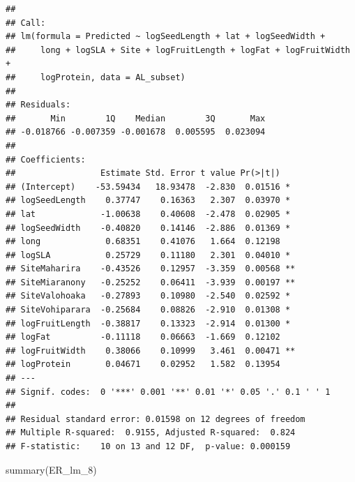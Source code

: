 \documentclass[
  12pt,
]{article}
\newenvironment{Shaded}{\begin{snugshade}}{\end{snugshade}}
\newcommand{\FunctionTok}[1]{\textcolor[rgb]{0.00,0.00,0.00}{#1}}
\newcommand{\NormalTok}[1]{#1}
\begin{document}
\begin{verbatim}
## 
## Call:
## lm(formula = Predicted ~ logSeedLength + lat + logSeedWidth + 
##     long + logSLA + Site + logFruitLength + logFat + logFruitWidth + 
##     logProtein, data = AL_subset)
## 
## Residuals:
##       Min        1Q    Median        3Q       Max 
## -0.018766 -0.007359 -0.001678  0.005595  0.023094 
## 
## Coefficients:
##                 Estimate Std. Error t value Pr(>|t|)   
## (Intercept)    -53.59434   18.93478  -2.830  0.01516 * 
## logSeedLength    0.37747    0.16363   2.307  0.03970 * 
## lat             -1.00638    0.40608  -2.478  0.02905 * 
## logSeedWidth    -0.40820    0.14146  -2.886  0.01369 * 
## long             0.68351    0.41076   1.664  0.12198   
## logSLA           0.25729    0.11180   2.301  0.04010 * 
## SiteMaharira    -0.43526    0.12957  -3.359  0.00568 **
## SiteMiaranony   -0.25252    0.06411  -3.939  0.00197 **
## SiteValohoaka   -0.27893    0.10980  -2.540  0.02592 * 
## SiteVohiparara  -0.25684    0.08826  -2.910  0.01308 * 
## logFruitLength  -0.38817    0.13323  -2.914  0.01300 * 
## logFat          -0.11118    0.06663  -1.669  0.12102   
## logFruitWidth    0.38066    0.10999   3.461  0.00471 **
## logProtein       0.04671    0.02952   1.582  0.13954   
## ---
## Signif. codes:  0 '***' 0.001 '**' 0.01 '*' 0.05 '.' 0.1 ' ' 1
## 
## Residual standard error: 0.01598 on 12 degrees of freedom
## Multiple R-squared:  0.9155, Adjusted R-squared:  0.824 
## F-statistic:    10 on 13 and 12 DF,  p-value: 0.000159
\end{verbatim}

\begin{Shaded}
\begin{Highlighting}[]
\FunctionTok{summary}\NormalTok{(ER\_lm\_8)}
\end{Highlighting}
\end{Shaded}
\end{document}
